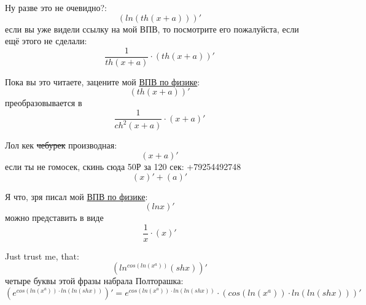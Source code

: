 \documentclass[a4paper, 12pt]{article}
\begin{document}
Ну разве это не очевидно?:
\begin{equation}
\left(ln\left(th\left(x + a\right)\right) \right)'
\end{equation}
если вы уже видели ссылку на мой ВПВ, то посмотрите его пожалуйста, если ещё этого не сделали:
\begin{equation}
\frac{1}{th\left(x + a\right)} \cdot \left(th\left(x + a\right) \right)'
\end{equation}

Пока вы это читаете, зацените мой \href{https://drive.google.com/drive/folders/1cQOob8lLqhboZnilkguOm7CtLHlbPb1G?usp=sharing}{ВПВ по физике}:
\begin{equation}
\left(th\left(x + a\right) \right)'
\end{equation}
преобразовывается в
\begin{equation}
\frac{1}{ch^2\left( x + a \right)} \cdot \left( x + a\right) '
\end{equation}

Лол кек \sout{чебурек} производная:
\begin{equation}
\left(x + a \right)'
\end{equation}
если ты не гомосек, скинь сюда 50Р за 120 сек: +79254492748
\begin{equation}
\left( x \right) ' + \left( a \right)'
\end{equation}

Я что, зря писал мой \href{https://drive.google.com/drive/folders/1cQOob8lLqhboZnilkguOm7CtLHlbPb1G?usp=sharing}{ВПВ по физике}:
\begin{equation}
\left(lnx \right)'
\end{equation}
можно представить в виде
\begin{equation}
\frac{1}{x} \cdot \left(x \right)'
\end{equation}

Just trust me, that:
\begin{equation}
\left(ln^{cos\left(ln\left(x^{a}\right)\right)}\left(shx\right) \right)'
\end{equation}
четыре буквы этой фразы набрала Полторашка:
\begin{equation}
\left(e^{cos\left(ln\left(x^{a}\right)\right)\cdot ln \left(ln\left(shx\right) \right)}  \right)' = e^{cos\left(ln\left(x^{a}\right)\right)\cdot ln \left(ln\left(shx\right) \right)} \cdot \left( cos\left(ln\left(x^{a}\right)\right)\cdot ln \left(ln\left(shx\right) \right) \right)'
\end{equation}
\end{document}
